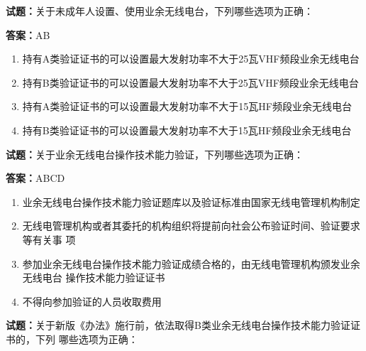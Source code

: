 \documentclass{ctexbook}
\begin{document}
\textbf{试题：}关于未成年人设置、使用业余无线电台，下列哪些选项为正确： 

\textbf{答案：}AB 

\begin{enumerate}[leftmargin=3em]
  \item 持有A类验证证书的可以设置最大发射功率不大于25瓦VHF频段业余无线电台 

  \item 持有B类验证证书的可以设置最大发射功率不大于25瓦VHF频段业余无线电台 

  \item 持有A类验证证书的可以设置最大发射功率不大于15瓦HF频段业余无线电台 

  \item 持有B类验证证书的可以设置最大发射功率不大于15瓦HF频段业余无线电台 

\end{enumerate}






\vspace{1em}

\textbf{试题：}关于业余无线电台操作技术能力验证，下列哪些选项为正确： 

\textbf{答案：}ABCD 

\begin{enumerate}[leftmargin=3em]
  \item 业余无线电台操作技术能力验证题库以及验证标准由国家无线电管理机构制定 

  \item 无线电管理机构或者其委托的机构组织将提前向社会公布验证时间、验证要求等有关事
项 

  \item 参加业余无线电台操作技术能力验证成绩合格的，由无线电管理机构颁发业余无线电台
操作技术能力验证证书 

  \item 不得向参加验证的人员收取费用 

\end{enumerate}





\vspace{1em}

\textbf{试题：}关于新版《办法》施行前，依法取得B类业余无线电台操作技术能力验证证书的，下列
哪些选项为正确： 
\end{document}
